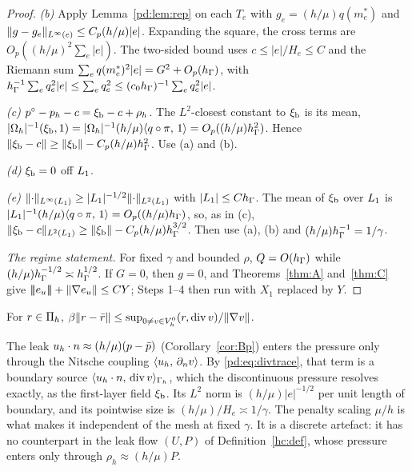 \begin{proof}
\emph{(b)} Apply Lemma~\ref{pd:lem:rep} on each $T_e$ with $g_e=(h/\mu)q(m_e^\ast)$ and $\lVert g-g_e\rVert_{L^\infty(e)}\le C_p(h/\mu)|e|$. Expanding the square, the cross terms are $O_p((h/\mu)^2\sum_e|e|)$. The two-sided bound uses $c\le|e|/H_e\le C$ and the Riemann sum $\sum_eq(m_e^\ast)^2|e|=G^2+O_p(h_\Gamma)$, with $h_\Gamma^{-1}\sum_eq_e^2|e|\le\sum_eq_e^2\le(c_0h_\Gamma)^{-1}\sum_eq_e^2|e|$.

\emph{(c)} $p^\circ-p_h-c=\xi_{\mathrm b}-c+\rho_h$. The $L^2$-closest constant to $\xi_{\mathrm b}$ is its mean, $|\Omega_h|^{-1}(\xi_{\mathrm b},1)=|\Omega_h|^{-1}(h/\mu)\langle q\circ\pi,\, 1\rangle=O_p((h/\mu)h_\Gamma^2)$. Hence $\lVert \xi_{\mathrm b}-c\rVert\ge\lVert \xi_{\mathrm b}\rVert-C_p(h/\mu)h_\Gamma^2$. Use (a) and (b).

\emph{(d)} $\xi_{\mathrm b}=0$ off $L_1$.

\emph{(e)} $\lVert \cdot\rVert_{L^\infty(L_1)}\ge|L_1|^{-1/2}\lVert \cdot\rVert_{L^2(L_1)}$ with $|L_1|\le Ch_\Gamma$. The mean of $\xi_{\mathrm b}$ over $L_1$ is $|L_1|^{-1}(h/\mu)\langle q\circ\pi,\, 1\rangle=O_p((h/\mu)h_\Gamma)$, so, as in (c), $\lVert \xi_{\mathrm b}-c\rVert_{L^2(L_1)}\ge\lVert \xi_{\mathrm b}\rVert-C_p(h/\mu)h_\Gamma^{3/2}$. Then use (a), (b) and $(h/\mu)h_\Gamma^{-1}=1/\gamma$.

\emph{The regime statement.} For fixed $\gamma$ and bounded $\rho$, $Q=O(h_\Gamma)$ while $(h/\mu)h_\Gamma^{-1/2}\asymp h_\Gamma^{1/2}$. If $G=0$, then $g=0$, and Theorems~\ref{thm:A} and~\ref{thm:C} give $|\!|\!|e_u|\!|\!|+\lVert \nabla e_u\rVert\le CY$; Steps 1--4 then run with $X_1$ replaced by $Y$.
\end{proof}

\begin{lemma}\label{pd:lem:infsup_ref}
For $r\in\Pi_h$, $\beta\lVert r-\bar r\rVert\le\sup_{0\ne v\in V_h^0}(r,\operatorname{div} v)/\lVert \nabla v\rVert$.
\end{lemma}

\begin{remark}[Mechanism]\label{pd:rem:gsmech}
The leak $u_h\cdot n\approx(h/\mu)(p-\bar p)$ (Corollary~\ref{cor:Bp}) enters the pressure only through the Nitsche coupling $\langle u_h,\, \partial_n v\rangle$. By \eqref{pd:eq:divtrace}, that term is a boundary source $\langle u_h\cdot n,\, \operatorname{div} v\rangle_{\Gamma_h}$, which the discontinuous pressure resolves exactly, as the first-layer field $\xi_{\mathrm b}$. Its $L^2$ norm is $(h/\mu)|e|^{-1/2}$ per unit length of boundary, and its pointwise size is $(h/\mu)/H_e\asymp1/\gamma$. The penalty scaling $\mu/h$ is what makes it independent of the mesh at fixed $\gamma$. It is a discrete artefact: it has no counterpart in the leak flow $(U,P)$ of Definition~\ref{hc:def}, whose pressure enters only through $\rho_h\approx(h/\mu)P$.
\end{remark}

